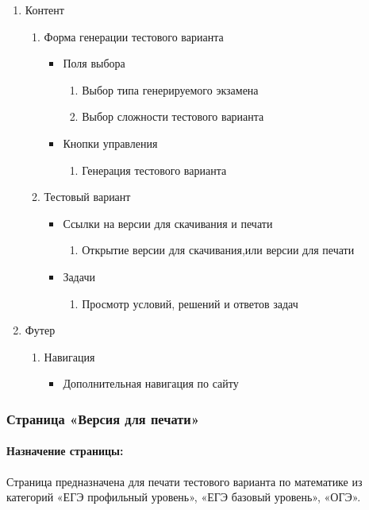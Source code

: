 \begin{enumerate}
	\item Контент
	\begin{enumerate}
		\item Форма генерации тестового варианта
		\begin{itemize}
		\item Поля выбора
		\begin{enumerate}
			\item Выбор типа генерируемого экзамена
			\item Выбор сложности тестового варианта
		\end{enumerate}
		\item Кнопки управления
		\begin{enumerate}
			\item Генерация тестового варианта
		\end{enumerate}
		\end{itemize}

		\item Тестовый вариант
		\begin{itemize}
		\item Ссылки на версии для скачивания и печати
		\begin{enumerate}
			\item Открытие версии для скачивания,или версии для печати
		\end{enumerate}
		\item Задачи
		\begin{enumerate}
			\item Просмотр условий, решений и ответов задач
		\end{enumerate}
		\end{itemize}
	\end{enumerate}

	\item Футер
	\begin{enumerate}
		\item Навигация
		\begin{itemize}
			\item Дополнительная навигация по сайту
		\end{itemize}
	\end{enumerate}
\end{enumerate}


\subsubsection{Страница «Версия для печати»}
\paragraph{Назначение страницы:} Страница предназначена для печати тестового варианта по математике из категорий «ЕГЭ профильный уровень», «ЕГЭ базовый уровень», «ОГЭ».

